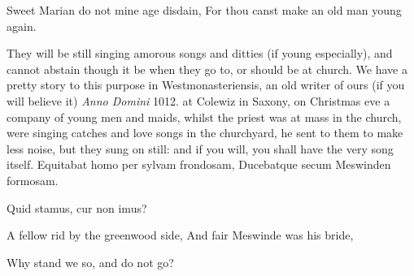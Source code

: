 Sweet Marian do not mine age disdain,
For thou canst make an old man young again.

They will be still singing amorous songs and ditties (if young
especially), and cannot abstain though it be when they go to, or should
be at church. We have a pretty story to this purpose in
Westmonasteriensis, an old writer of ours (if you will believe
it) \emph{Anno Domini} 1012. at Colewiz in Saxony, on Christmas eve a company
of young men and maids, whilst the priest was at mass in the church,
were singing catches and love songs in the churchyard, he sent to them
to make less noise, but they sung on still: and if you will, you shall
have the very song itself.
Equitabat homo per sylvam frondosam,
Ducebatque secum Meswinden formosam.

Quid stamus, cur non imus?


A fellow rid by the greenwood side,
And fair Meswinde was his bride,

Why stand we so, and do not go?

